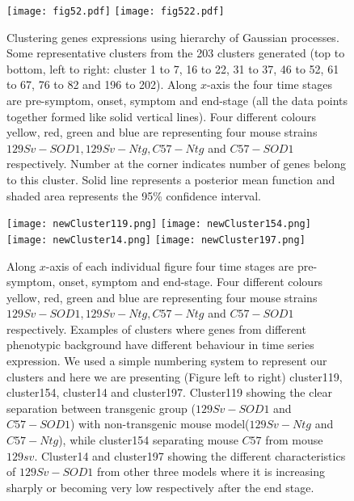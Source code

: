 \begin{figure}
 \begin{center}
    \texttt{[image: fig52.pdf]}
    \texttt{[image: fig522.pdf]}
    \caption [Clustering genes expressions using hierarchy of Gaussian processes] 
    {Clustering genes expressions using hierarchy of Gaussian processes. Some representative clusters from the 203 clusters generated (top to bottom, left to right: cluster 1 to 7, 16 to 22, 31 to 37, 46 to 52, 61 to 67, 76 to 82 and 196 to 202). Along $x$-axis the four time stages are pre-symptom, onset, symptom and end-stage (all the data points together formed like solid vertical lines). Four different colours yellow, red, green and blue are representing four mouse strains $129Sv-SOD1, 129Sv-Ntg, C57-Ntg$ and $C57-SOD1$ respectively. Number at the corner indicates number of genes belong to this cluster. Solid line represents a posterior mean function and shaded area represents the 95\% confidence interval.\label{fig:fewClusters}}
 \end{center}
\end{figure}

\begin{figure}
 \begin{center}
 \texttt{[image: newCluster119.png]}
 \texttt{[image: newCluster154.png]}
 \texttt{[image: newCluster14.png]}
 \texttt{[image: newCluster197.png]}
  \caption [Few examples of clusters with different dynamics]
    {Along $x$-axis of each individual figure four time stages are pre-symptom, onset, symptom and end-stage. Four different colours yellow, red, green and blue are representing four mouse strains $129Sv-SOD1, 129Sv-Ntg, C57-Ntg$ and $C57-SOD1$ respectively. Examples of clusters where genes from different phenotypic background have different behaviour in time series expression. We used a simple numbering system to represent our clusters and here we are presenting (Figure left to  right) cluster119, cluster154, cluster14 and cluster197. Cluster119 showing the clear separation between transgenic group ($129Sv-SOD1$ and $C57-SOD1$) with non-transgenic mouse model($129Sv-Ntg$ and $C57-Ntg$), while cluster154 separating mouse $C57$ from mouse $129sv$. Cluster14 and cluster197 showing the different characteristics of $129Sv-SOD1$ from other three models where it is increasing sharply or becoming very low respectively after the end stage. \label{fig:fourSampleClusters}}
 \end{center}
\end{figure}


